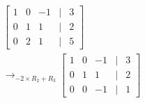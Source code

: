 \documentclass[preview]{standalone}
\begin{document}
\begin{align*}
\begin{bmatrix} 1 & 0 & -1 & | & 3 \\ 0 & 1 & 1 & | & 2 \\ 0 & 2 & 1 & | & 5 \end{bmatrix}\\ \rightarrow_{-2\times R_2 + R_3} \begin{bmatrix} 1 & 0 & -1 & | & 3 \\ 0 & 1 & 1 & | & 2 \\ 0 & 0 & -1 & | & 1 \end{bmatrix}
\end{align*}
\end{document}
